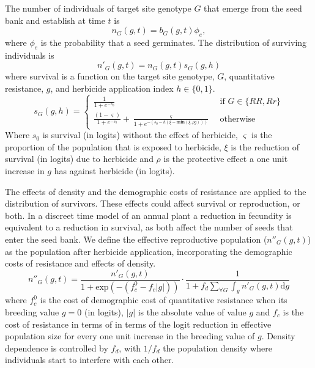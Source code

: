 \documentclass[10pt,letterpaper]{article}
\begin{document}
The number of individuals of target site genotype $G$ that emerge from the seed bank and establish at time $t$ is 
\begin{equation}\label{eq:above_ground}
	n_G(g, t) = b_G(g, t)\phi_e,
\end{equation}
where $\phi_e$ is the probability that a seed germinates. The distribution of surviving individuals is 
\begin{equation}\label{eq:abg_sur}
	n'_G(g, t) = n_G(g, t)s_G(g, h) 
\end{equation}
where survival is a function on the target site genotype, $G$, quantitative resistance, $g$, and herbicide application index $h \in \{0, 1\}$.   
\begin{equation}\label{eq:sur_G}
	s_G(g, h) = \begin{cases} 
		\frac{1}{1 + e^{-s_0}} &\text{~if~} G \in \{RR, Rr\} \\
		\frac{(1 - \varsigma)}{1 + e^{-s_0}} + \frac{\varsigma}{1 + e^{-\left(s_0 - h\left(\xi - \textbf{min}(\xi, \rho g) \right)\right)}} &\text{~otherwise~} 		
	\end{cases} 
\end{equation}  
Where $s_0$ is survival (in logits) without the effect of herbicide, $\varsigma$ is the proportion of the population that is exposed to herbicide, $\xi$ is the reduction of survival (in logits) due to herbicide and $\rho$ is the protective effect a one unit increase in $g$ has against herbicide (in logits).   

The effects of density and the demographic costs of resistance are applied to the distribution of survivors. These effects could affect survival or reproduction, or both. In a discreet time model of an annual plant a reduction in fecundity is equivalent to a reduction in survival, as both affect the number of seeds that enter the seed bank. We define the effective reproductive population ($n''_G(g, t)$) as the population after herbicide application, incorporating the demographic costs of resistance and effects of density. 
\begin{equation}\label{eq:effect_pop}
	n''_G(g, t) = \frac{n'_G(g, t)}{1 + \text{exp}(-(f_c^0 - f_c|g|))}\cdot\frac{1}{1 + f_d\sum_{\forall G} \int_g n'_G(g, t)\text{d}g}
\end{equation} 
where $f_c^0$ is the cost of demographic cost of quantitative resistance when its breeding value $g = 0$ (in logits), $|g|$ is the absolute value of value $g$ and $f_c$ is the cost of resistance in terms of in terms of the logit reduction in effective population size for every one unit increase in the breeding value of $g$. Density dependence is controlled by $f_d$, with $1/f_d$ the population density where individuals start to interfere with each other. 
\end{document}
